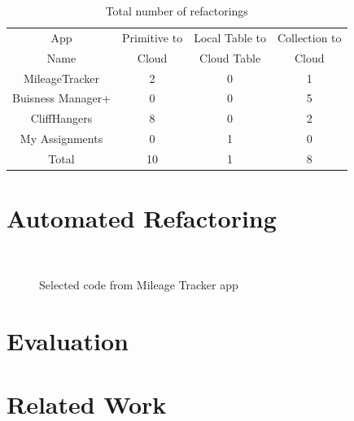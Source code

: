 \documentclass{sigplanconf}
\begin{document}
\begin{table}[htdp]

\begin{center}
\begin{tabular}{|c|c|c|c|}
\hline
App  & Primitive to  & Local Table to   & Collection to  \\
 Name &  Cloud  &  Cloud Table  & Cloud \\
\hline
MileageTracker & 2 & 0 & 1\\
\hline
Buisness Manager+ & 0 & 0 & 5\\
\hline
CliffHangers & 8 & 0 & 2\\
\hline
My Assignments & 0 & 1 & 0\\
\hline
\hline
Total & 10 & 1  & 8 \\
\hline
\end{tabular}
\end{center}
\nocaptionrule
\caption{Total number of refactorings}
\label{tab:refactoringsFormative}
\end{table}%




\section{Automated Refactoring}

\begin{figure}
   \centering
    \mbox{
      \subfigure[before]{
      
      \label{fig:aicOverload}
      }
      \hspace{0.2in}
      \subfigure[after]{
      
      \label{fig:lambdaOverload}
      }
    }
    \caption{Selected code from Mileage Tracker app}
    \label{fig:anonCornerCase2}
\end{figure}


\section{Evaluation}

\section{Related Work}
\end{document}
